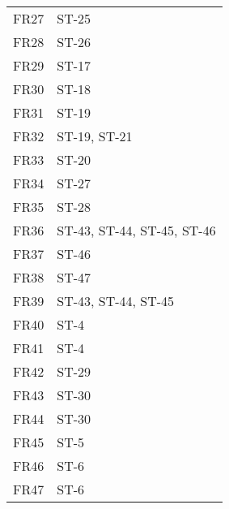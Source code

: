 \documentclass[12pt, titlepage]{article}
\begin{document}
\begin{longtable}{|l|l|}
		FR27  & ST-25\\
		FR28  & ST-26\\
		FR29  & ST-17\\
		FR30  & ST-18\\
		FR31  & ST-19\\
		FR32  & ST-19, ST-21\\
		FR33  & ST-20\\
		FR34  & ST-27\\
		FR35  & ST-28\\
		FR36  & ST-43, ST-44, ST-45, ST-46\\
		FR37  & ST-46\\
		FR38  & ST-47\\
		FR39  & ST-43, ST-44, ST-45\\
		FR40  & ST-4\\
		FR41  & ST-4\\
		FR42  & ST-29\\
		FR43  & ST-30\\
		FR44  & ST-30\\
		FR45  & ST-5\\
		FR46  & ST-6\\
		FR47  & ST-6\\
		\hline
	\end{longtable}
	
	\newpage
	
\end{document}
